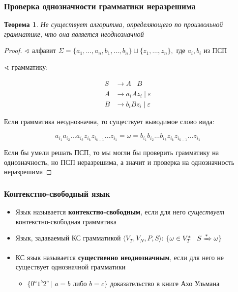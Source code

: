 \documentclass{beamer}
\newtheorem{rutheorem}{Теорема}
\newcommand{\derives}[1][*]{\xRightarrow[]{#1}}
\begin{document}
\begin{frame}[fragile]
  \transwipe[direction=90]
  \frametitle{Проверка однозначности грамматики неразрешима}

\begin{rutheorem}
  Не существует алгоритма, определяющего по произвольной грамматике, что она является неоднозначной
\end{rutheorem}

\begin{proof}
  $\sphericalangle \text{ алфавит } \Sigma = \{a_1, \dots, a_n, b_1, \dots, b_n\} \sqcup \{z_1, \dots, z_n\}, \text{ где } a_i, b_i \text{ из ПСП }$

  $\sphericalangle$ грамматику: 

\vspace{-1.2cm}

  \begin{align*}
    S &\to A \mid B \\ 
    A &\to a_i A z_i \mid \varepsilon \\
    B &\to b_i B z_i \mid \varepsilon
  \end{align*}

  \vspace{-0.35cm}

  Если грамматика неоднозначна, то существует выводимое слово вида: 

  \vspace{-0.5cm}
  \[a_{i_1} a_{i_2} \dots a_{i_k} z_{i_k} z_{i_{k-1}} \dots z_{i_1} = \omega = b_{i_1} b_{i_2} \dots b_{i_k} z_{i_k} z_{i_{k-1}} \dots z_{i_1}\]

  Если бы умели решать ПСП, то мы могли бы проверить грамматику на однозначность, но ПСП неразрешима, а значит и проверка на однозначность неразрешима 
\end{proof}

\end{frame}


\begin{frame}[fragile]
  \transwipe[direction=90]
  \frametitle{Контекстно-свободный язык}
  \begin{itemize}
    \item Язык называется \textbf{контекстно-свободным}, если для него \emph{существует} контекстно-свободная грамматика
    \item Язык, задаваемый КС грамматикой $\langle V_T, V_N, P, S\rangle$: $\{ \omega \in V_T^* \mid S \derives \omega \}$
    \item КС язык называется \textbf{существенно неоднозначным}, если для него не существует однозначной грамматики
    \begin{itemize}
      \item $\{0^a 1^b 2^c \mid a = b \text{ либо } b = c \}$ \hfill доказательство в книге Ахо Ульмана
    \end{itemize}
  \end{itemize}
\end{frame}
\end{document}
